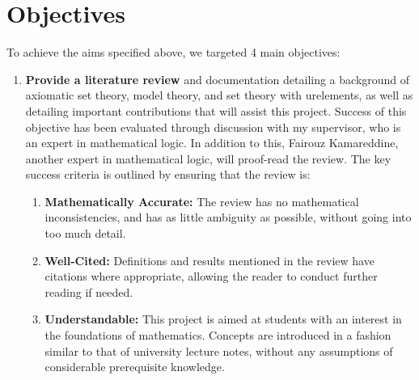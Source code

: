 \documentclass[11pt]{report}
\theoremstyle{definition}
\theoremstyle{theorem}
\theoremstyle{lemma}
\begin{document}
\section{Objectives}\label{objectives}
To achieve the aims specified above, we targeted 4 main objectives:
\begin{enumerate}
  \item \textbf{Provide a literature review} and documentation detailing a background of axiomatic set theory, model theory, and set theory with urelements, as well as detailing important contributions that will assist this project.
  Success of this objective has been evaluated through discussion with my supervisor, who is an expert in mathematical logic.
  In addition to this, Fairouz Kamareddine, another expert in mathematical logic, will proof-read the review.  
  The key success criteria is outlined by ensuring that the review is:
  \begin{enumerate}
    \item \textbf{Mathematically Accurate:} The review has no mathematical inconsistencies, and has as little ambiguity as possible, without going into too much detail. 
    \item \textbf{Well-Cited:} Definitions and results mentioned in the review have citations where appropriate, allowing the reader to conduct further reading if needed. 
    \item \textbf{Understandable:} This project is aimed at students with an interest in the foundations of mathematics. Concepts are introduced in a fashion similar to that of university lecture notes, without any assumptions of considerable prerequisite knowledge. 
  \end{enumerate} 


\end{enumerate}
\end{document}

